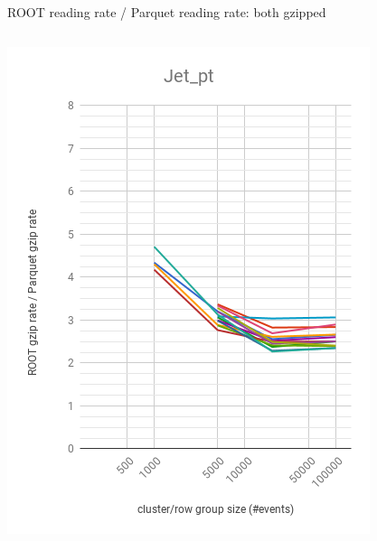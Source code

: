 \documentclass[aspectratio=169]{beamer}
\begin{document}
\begin{frame}{ROOT reading rate / Parquet reading rate: both gzipped}
\begin{columns}
\begin{center}
\includegraphics[width=\linewidth]{root-gzip-parquet-gzip-Jet_pt.png}
\end{center}
\begin{center}

\end{center}
\end{columns}
\end{frame}
\end{document}
